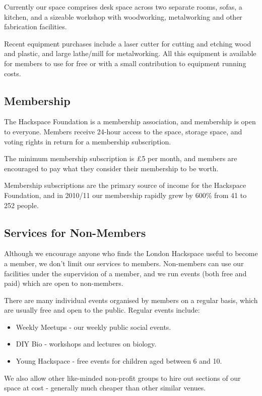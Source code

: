 Currently our space comprises desk space across two separate rooms, sofas, a kitchen, and a sizeable workshop with woodworking,
metalworking and other fabrication facilities.

Recent equipment purchases include a laser cutter for cutting and etching wood and plastic, and large lathe/mill for metalworking.
All this equipment is available for members to use for free or with a small contribution to equipment running costs.

\subsection{Membership}

The Hackspace Foundation is a membership association, and membership is open to everyone.
Members receive 24-hour access to the space, storage space, and voting rights in return for a membership subscription.

The minimum membership subscription is £5 per month, and members are encouraged to pay what they consider their
membership to be worth.

Membership subscriptions are the primary source of income for the Hackspace Foundation, and in 2010/11 our
membership rapidly grew by 600\% from 41 to 252 people.

\subsection{Services for Non-Members}

Although we encourage anyone who finds the London Hackspace useful to become a member, we don't limit our services to members.
Non-members can use our facilities under the supervision of a member, and we run events (both free and paid) which are open to non-members.

There are many individual events organised by members on a regular basis, which are usually free and open to the public. Regular events include:

\begin{itemize}
    \item Weekly Meetups - our weekly public social events.
    \item DIY Bio - workshops and lectures on biology.
    \item Young Hackspace - free events for children aged between 6 and 10.
\end{itemize}

We also allow other like-minded non-profit groups to hire out sections of our space at cost - generally much cheaper than other similar venues.


